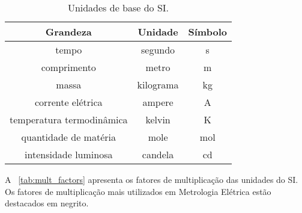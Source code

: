 \documentclass{book}
\begin{document}
\begin{table}[!ht]
\centering
\caption{Unidades de base do SI.}
\begin{tabular}{ccc}
  \toprule[.8pt]
  Grandeza & Unidade & Símbolo \\
  \midrule[.5pt]
  tempo & segundo & s \\
  comprimento & metro & m \\
  massa & kilograma & kg \\
  corrente elétrica & ampere & A \\
  temperatura termodinâmica & kelvin & K \\
  quantidade de matéria & mole & mol \\
  intensidade luminosa & candela & cd \\
  \bottomrule[.8pt]
\end{tabular}
\label{tab:si_base}
\end{table}





A \tablename~\ref{tab:mult_factors} apresenta os fatores de multiplicação das unidades do SI. Os fatores de multiplicação mais utilizados em Metrologia Elétrica estão destacados em negrito.
\end{document}
